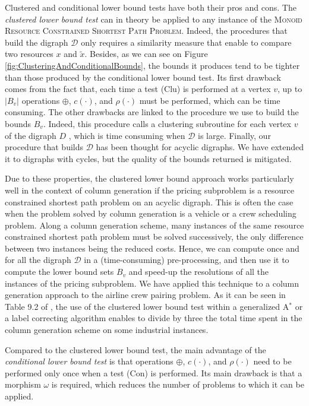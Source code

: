 \documentclass[11pt]{amsart}
\theoremstyle{plain}
\theoremstyle{remark}
\newcommand{\MRCSP}{\textsc{Monoid Resource Constrained Shortest Path Problem}\xspace}
\newcommand{\rplus}{\oplus}
\newcommand{\rcost}{c}
\newcommand{\rmeas}{\rho}
\newcommand{\re}{x}
\begin{document}
Clustered and conditional lower bound tests have both their pros and cons. 
The \emph{clustered lower bound test} can in theory be applied to any instance of the \MRCSP. Indeed, the procedures that build the digraph $\mathcal{D}$ only requires a similarity measure that enable to compare two resources $\re$ and $\tilde{\re}$. Besides, as we can see on Figure \ref{fig:ClusteringAndConditionalBounds}, the bounds it produces tend to be tighter than those produced by the conditional lower bound test. Its first drawback comes from the fact that, each time a test (Clu) is performed at a vertex $v$, up to $|B_{v}|$ operations $\rplus$, $\rcost(\cdot)$, and $\rmeas(\cdot)$ must be performed, which can be time consuming. The other drawbacks are linked to the procedure we use to build the bounds $B_{v}$. Indeed, this procedure calls a clustering subroutine for each vertex $v$ of the digraph $D$ \cite{parmentier2016thesis}, which is time consuming when $\mathcal{D}$ is large. Finally, our procedure that builds $\mathcal{D}$ has been thought for acyclic digraphs. We have extended it to digraphs with cycles, but the quality of the bounds returned is mitigated.

Due to these properties, the clustered lower bound approach works particularly well in the context of column generation if the pricing subproblem is a resource constrained shortest path problem on an acyclic digraph. This is often the case when the problem solved by column generation is a vehicle or a crew scheduling problem. Along a column generation scheme, many instances of the same resource constrained shortest path problem must be solved successively, the only difference between two instances being the reduced costs. Hence, we can compute once and for all the digraph $\mathcal{D}$ in a (time-consuming) pre-processing, and then use it to compute the lower bound sets $B_{v}$ and speed-up the resolutions of all the instances of the pricing subproblem. We have applied this technique to a column generation approach to the airline crew pairing problem. As it can be seen in Table 9.2 of \cite{parmentier2016thesis}, the use of the clustered lower bound test within a generalized A$^{*}$ or a label correcting algorithm enables to divide by three the total time spent in the column generation scheme on some industrial instances.

Compared to the clustered lower bound test, the main advantage of the \emph{conditional lower bound test} is that operations $\rplus$, $\rcost(\cdot)$, and $\rmeas(\cdot)$ need to be performed only once when a test (Con) is performed. Its main drawback is that a morphism $\omega$ is required, which reduces the number of problems to which it can be applied.
\end{document}
